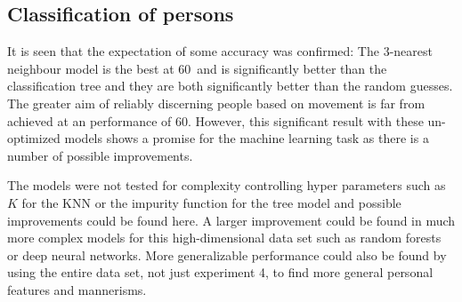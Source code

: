 \documentclass[11pt,fleqn]{article}
\begin{document}
\subsection{Classification of persons}
It is seen that the expectation of some accuracy was confirmed: The 3-nearest neighbour model is the best at 60\pro\ and is significantly better than the classification tree and they are both significantly better than the random guesses. The greater aim of reliably discerning people based on movement is far from achieved at an performance of 60\pro. However, this significant result with these un-optimized models shows a promise for the machine learning task as there is a number of possible improvements. 



The models were not tested for complexity controlling hyper parameters such as \(K\) for the KNN or the impurity function for the tree model and possible improvements could be found here. A larger improvement could be found in much more complex models for this high-dimensional data set such as random forests or deep neural networks. More generalizable performance could also be found by using the entire data set, not just experiment 4, to find more general personal  features and mannerisms.
\end{document}
